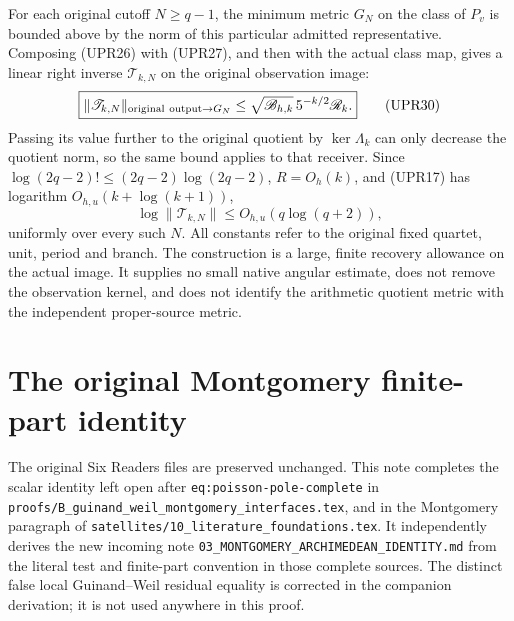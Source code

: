 \documentclass[11pt,a4paper]{article}
\providecommand{\dd}{\,d}
\begin{document}
For each original cutoff \(N\ge q-1\), the minimum metric \(G_N\)
on the class of \(P_v\) is bounded above by the norm of this
particular admitted representative.  Composing (UPR26) with
(UPR27), and then with the actual class map, gives a linear
right inverse \(\mathscr T_{k,N}\) on the original observation image:
\[
\boxed{\displaystyle
\|\mathscr T_{k,N}\|_{{\rm original\ output}\to G_N}
\le \sqrt{\mathscr B_{h,k}}\,5^{-k/2}\mathscr R_k.}
\tag{UPR30}
\]
Passing its value further to the original quotient by
\(\ker\Lambda_k\) can only decrease the quotient norm, so the same
bound applies to that receiver.
Since \(\log(2q-2)!\le(2q-2)\log(2q-2)\), \(R=O_h(k)\),
and (UPR17) has logarithm \(O_{h,u}(k+\log(k+1))\),
\[
\log\|\mathscr T_{k,N}\|
\le O_{h,u}(q\log(q+2)),
\tag{UPR31}
\]
uniformly over every such \(N\).
All constants refer to the original fixed quartet, unit, period
and branch.  The construction is a large, finite recovery allowance
on the actual image.  It supplies no small native angular estimate,
does not remove the observation kernel, and does not identify the
arithmetic quotient metric with the independent proper-source metric.
\endgroup



\endgroup

\clearpage
\begingroup
\def\R{\mathbb R}
\def\C{\mathbb C}
\def\PF{\operatorname{PF}}
\def\dd{\,d}

\setcounter{equation}{0}
\renewcommand{\theequation}{A03MA.\arabic{equation}}
\section*{The original Montgomery finite-part identity}

\noindent The original Six Readers files are preserved unchanged. This note
completes the scalar identity left open after
\texttt{eq:poisson-pole-complete} in
\nolinkurl{proofs/B_guinand_weil_montgomery_interfaces.tex}, and in the
Montgomery paragraph of
\texttt{satellites/10\_literature\_foundations.tex}.
It independently derives the new incoming note
\texttt{03\_MONTGOMERY\_ARCHIMEDEAN\_IDENTITY.md} from the literal test and
finite-part convention in those complete sources. The distinct false local
Guinand--Weil residual equality is corrected in the companion derivation;
it is not used anywhere in this proof.
\end{document}
